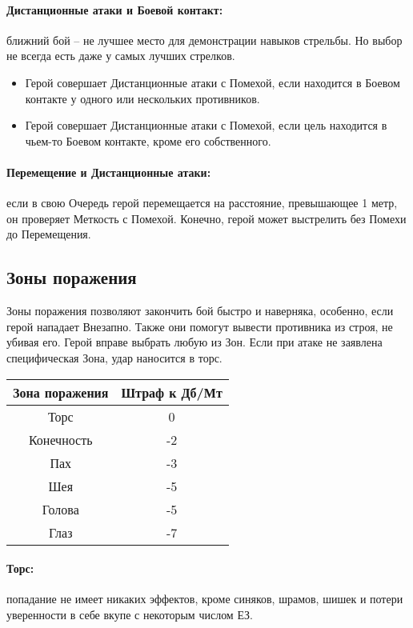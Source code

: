 \paragraph{Дистанционные атаки и Боевой контакт:} ближний бой – не лучшее место для демонстрации навыков стрельбы. Но выбор не всегда есть даже у самых лучших стрелков.
\begin{itemize}
  \item Герой совершает Дистанционные атаки с Помехой, если находится в Боевом контакте у одного или нескольких противников.
  \item Герой совершает Дистанционные атаки с Помехой, если цель находится в чьем-то Боевом контакте, кроме его собственного.
\end{itemize}
\paragraph{Перемещение и Дистанционные атаки:} если в свою Очередь герой перемещается на расстояние, превышающее 1 метр, он проверяет Меткость с Помехой. Конечно, герой может выстрелить без Помехи до Перемещения.
\subsection{Зоны поражения}
Зоны поражения позволяют закончить бой быстро и наверняка, особенно, если герой нападает Внезапно. Также они помогут вывести противника из строя, не убивая его.
\newline Герой вправе выбрать любую из Зон. Если при атаке не заявлена специфическая Зона, удар наносится в торс.
\begin{center} \begin{tabular}{|c|c|} \hline
  \textbf{Зона поражения} & \textbf{Штраф к Дб/Мт} \\ \hline
  Торс & 0 \\ \hline
  Конечность & -2 \\ \hline
  Пах & -3 \\ \hline
  Шея & -5 \\ \hline
  Голова & -5 \\ \hline
  Глаз & -7 \\ \hline
\end{tabular} \end{center}
\paragraph{Торс:} попадание не имеет никаких эффектов, кроме синяков, шрамов, шишек и потери уверенности в себе вкупе с некоторым числом ЕЗ. 
